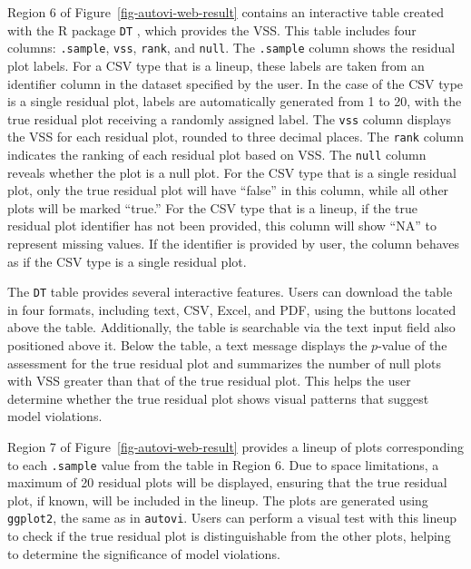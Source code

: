 \documentclass[
doublespace,
  times]{anzsauth}
\begin{document}
Region 6 of Figure~\ref{fig-autovi-web-result} contains an interactive
table created with the R package \texttt{DT} \citep{dt}, which provides
the VSS. This table includes four columns: \texttt{.sample},
\texttt{vss}, \texttt{rank}, and \texttt{null}. The \texttt{.sample}
column shows the residual plot labels. For a CSV type that is a lineup,
these labels are taken from an identifier column in the dataset
specified by the user. In the case of the CSV type is a single residual
plot, labels are automatically generated from 1 to 20, with the true
residual plot receiving a randomly assigned label. The \texttt{vss}
column displays the VSS for each residual plot, rounded to three decimal
places. The \texttt{rank} column indicates the ranking of each residual
plot based on VSS. The \texttt{null} column reveals whether the plot is
a null plot. For the CSV type that is a single residual plot, only the
true residual plot will have ``false'' in this column, while all other
plots will be marked ``true.'' For the CSV type that is a lineup, if the
true residual plot identifier has not been provided, this column will
show ``NA'' to represent missing values. If the identifier is provided
by user, the column behaves as if the CSV type is a single residual
plot.

The \texttt{DT} table provides several interactive features. Users can
download the table in four formats, including text, CSV, Excel, and PDF,
using the buttons located above the table. Additionally, the table is
searchable via the text input field also positioned above it. Below the
table, a text message displays the \(p\)-value of the assessment for the
true residual plot and summarizes the number of null plots with VSS
greater than that of the true residual plot. This helps the user
determine whether the true residual plot shows visual patterns that
suggest model violations.

Region 7 of Figure~\ref{fig-autovi-web-result} provides a lineup of
plots corresponding to each \texttt{.sample} value from the table in
Region 6. Due to space limitations, a maximum of 20 residual plots will
be displayed, ensuring that the true residual plot, if known, will be
included in the lineup. The plots are generated using \texttt{ggplot2},
the same as in \texttt{autovi}. Users can perform a visual test with
this lineup to check if the true residual plot is distinguishable from
the other plots, helping to determine the significance of model
violations.
\end{document}

